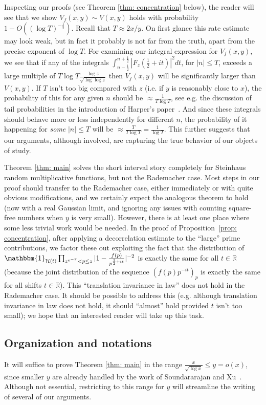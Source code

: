 \documentclass[12pt, notitlepage]{amsart}
\numberwithin{equation}{section}
\def\R{\mathbb R}
\theoremstyle{remark}
\theoremstyle{definition}
\theoremstyle{remark}
\numberwithin{equation}{section}
\begin{document}
Inspecting our proofs (see Theorem \ref{thm: concentration} below), the reader will see that we show $V_f(x, y)\sim V(x, y)$ holds with probability $1- O((\log T)^{-\frac 15})$. Recall that $T \approx 2x/y$. On first glance this rate estimate may look weak, but in fact it probably is not far from the truth, apart from the precise exponent of $\log T$. For examining our integral expression for $V_f(x, y)$, we see that if any of the integrals $\int_{n-\frac 12}^{n+\frac 12}|F_z(\frac 12+it)|^{2} dt$, for $|n| \leq T$, exceeds a large multiple of $T \log T \frac{\log z}{\sqrt{\log \log z}}$ then $V_f(x, y)$ will be significantly larger than $V(x, y)$. If $T$ isn't too big compared with $z$ (i.e. if $y$ is reasonably close to $x$), the probability of this for any given $n$ should be $\approx \frac{1}{T\log T}$, see e.g. the discussion of tail probabilities in the introduction of Harper's paper~\cite{HarperLow}. And since these integrals should behave more or less independently for different $n$, the probability of it happening for {\em some} $|n| \leq T$ will be $\approx \frac{T}{T\log T} = \frac{1}{\log T}$. This further suggests that our arguments, although involved, are capturing the true behavior of our objects of study.

Theorem \ref{thm: main} solves the short interval story completely for Steinhaus random multiplicative functions, but not the Rademacher case. Most steps in our proof should transfer to the Rademacher case, either immediately or with quite obvious modifications, and we certainly expect the analogous theorem to hold (now with a real Gaussian limit, and ignoring any issues with counting square-free numbers when $y$ is very small). However, there is at least one place where some less trivial work would be needed. In the proof of Proposition~\ref{prop: concentration}, after applying a decorrelation estimate to the ``large'' prime contributions, we factor these out exploiting the fact that the distribution of $\mathbbm{1}_{\mathcal{H}(t)} \prod_{ z^{e^{-\tau}}<p\le z} |1-\frac{f(p)}{p^{\frac 12+it}}|^{-2}$ is exactly the same for all $t \in \R$ (because the joint distribution of the sequence $(f(p)p^{-it})_{p}$ is exactly the same for all shifts $t \in \R$). This ``translation invariance in law'' does not hold in the Rademacher case. It should be possible to address this (e.g. although translation invariance in law does not hold, it should ``almost'' hold provided $t$ isn't too small); we hope that an interested reader will take up this task.
 

\subsection{Organization and notations}
It will suffice to prove Theorem \ref{thm: main} in the range $\frac{x}{\sqrt{\log x}} \leq y = o(x)$, since smaller $y$ are already handled by the work of Soundararajan and Xu~\cite{SoundXu}.  Although not essential, restricting to this range for $y$ will streamline the writing of several of our arguments.
\end{document}
